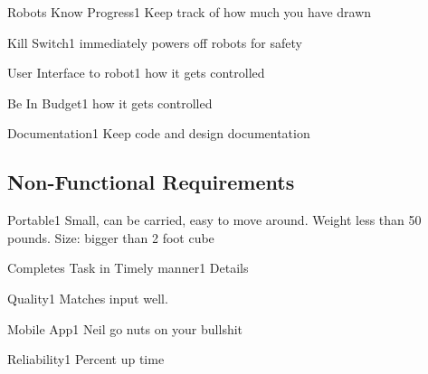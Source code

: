 \begin{functional_requirement}{Robots Know Progress}{1}
Keep track of how much you have drawn
\end{functional_requirement}


\begin{functional_requirement}{Kill Switch}{1}
immediately powers off robots for safety
\end{functional_requirement}

\begin{functional_requirement}{User Interface to robot}{1}
how it gets controlled
\end{functional_requirement}

\begin{functional_requirement}{Be In Budget}{1}
how it gets controlled
\end{functional_requirement}

\begin{functional_requirement}{Documentation}{1}
Keep code and design documentation
\end{functional_requirement}


\subsection{Non-Functional Requirements}

\begin{nonfunctional_requirement}{Portable}{1}
Small, can be carried, easy to move around. Weight less than 50 pounds. Size: bigger than 2 foot cube
\end{nonfunctional_requirement}

\begin{nonfunctional_requirement}{Completes Task in Timely manner}{1}
Details
\end{nonfunctional_requirement}

\begin{nonfunctional_requirement}{Quality}{1}
Matches input well. 
\end{nonfunctional_requirement}

\begin{nonfunctional_requirement}{Mobile App}{1}
Neil go nuts on your bullshit
\end{nonfunctional_requirement}

\begin{nonfunctional_requirement}{Reliability}{1}
Percent up time
\end{nonfunctional_requirement}

